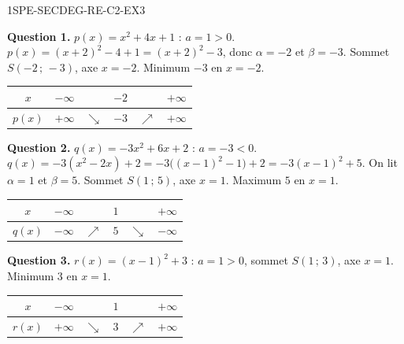 \begin{corrige}{1SPE-SECDEG-RE-C2-EX3}

\textbf{Question 1.} $p(x) = x^2 + 4x + 1$ : $a = 1 > 0$.
$p(x)=(x+2)^2-4+1=(x+2)^2-3$, donc $\alpha=-2$ et $\beta=-3$.
Sommet $S(-2\,;\,-3)$, axe $x = -2$. Minimum $-3$ en $x = -2$.

\begin{center}
\begin{tabular}{|c|ccccc|}
\hline
$x$ & $-\infty$ & & $-2$ & & $+\infty$ \\
\hline
$p(x)$ & $+\infty$ & $\searrow$ & $-3$ & $\nearrow$ & $+\infty$ \\
\hline
\end{tabular}
\end{center}

\textbf{Question 2.} $q(x) = -3x^2 + 6x + 2$ : $a = -3 < 0$.
$q(x)=-3(x^2-2x)+2=-3\bigl((x-1)^2-1\bigr)+2=-3(x-1)^2+5$.
On lit $\alpha=1$ et $\beta=5$.
Sommet $S(1\,;\,5)$, axe $x = 1$. Maximum $5$ en $x = 1$.

\begin{center}
\begin{tabular}{|c|ccccc|}
\hline
$x$ & $-\infty$ & & $1$ & & $+\infty$ \\
\hline
$q(x)$ & $-\infty$ & $\nearrow$ & $5$ & $\searrow$ & $-\infty$ \\
\hline
\end{tabular}
\end{center}


\textbf{Question 3.} $r(x) = (x-1)^2 + 3$ : $a = 1 > 0$, sommet $S(1\,;\,3)$, axe $x = 1$. Minimum $3$ en $x = 1$.

\begin{center}
\begin{tabular}{|c|ccccc|}
\hline
$x$ & $-\infty$ & & $1$ & & $+\infty$ \\
\hline
$r(x)$ & $+\infty$ & $\searrow$ & $3$ & $\nearrow$ & $+\infty$ \\
\hline
\end{tabular}
\end{center}

\end{corrige}
